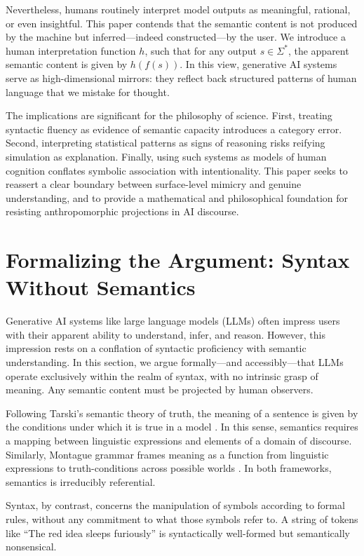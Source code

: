 \documentclass[12pt]{article}
\theoremstyle{plain}
\theoremstyle{definition}
\theoremstyle{remark}
\begin{document}
Nevertheless, humans routinely interpret model outputs as meaningful, rational, or even insightful. This paper contends that the semantic content is not produced by the machine but inferred—indeed constructed—by the user. We introduce a human interpretation function \( h \), such that for any output \( s \in \Sigma^* \), the apparent semantic content is given by \( h(f(s)) \). In this view, generative AI systems serve as high-dimensional mirrors: they reflect back structured patterns of human language that we mistake for thought.

The implications are significant for the philosophy of science. First, treating syntactic fluency as evidence of semantic capacity introduces a category error. Second, interpreting statistical patterns as signs of reasoning risks reifying simulation as explanation. Finally, using such systems as models of human cognition conflates symbolic association with intentionality. This paper seeks to reassert a clear boundary between surface-level mimicry and genuine understanding, and to provide a mathematical and philosophical foundation for resisting anthropomorphic projections in AI discourse.

\section{Formalizing the Argument: Syntax Without Semantics}

Generative AI systems like large language models (LLMs) often impress users with their apparent ability to understand, infer, and reason. However, this impression rests on a conflation of syntactic proficiency with semantic understanding. In this section, we argue formally—and accessibly—that LLMs operate exclusively within the realm of syntax, with no intrinsic grasp of meaning. Any semantic content must be projected by human observers.

Following Tarski’s semantic theory of truth, the meaning of a sentence is given by the conditions under which it is true in a model \parencite{tarski1943truth}. In this sense, semantics requires a mapping between linguistic expressions and elements of a domain of discourse. Similarly, Montague grammar frames meaning as a function from linguistic expressions to truth-conditions across possible worlds \parencite{montague1974formal}. In both frameworks, semantics is irreducibly referential.

Syntax, by contrast, concerns the manipulation of symbols according to formal rules, without any commitment to what those symbols refer to. A string of tokens like ``The red idea sleeps furiously'' is syntactically well-formed but semantically nonsensical.
\end{document}
